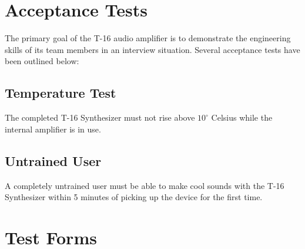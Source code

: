 \documentclass{article}
\begin{document}
\section{Acceptance Tests}
The primary goal of the T-16 audio amplifier is to demonstrate the
engineering skills of its team members in an interview
situation. Several acceptance tests have been outlined below:

\subsection{Temperature Test}
The completed T-16 Synthesizer must not rise above $10^\circ$ Celsius
while the internal amplifier is in use.
\subsection{Untrained User}
A completely untrained user must be able to make cool sounds with the
T-16 Synthesizer within 5 minutes of picking up the device for the
first time. 
\newpage
\section {Test Forms}
\end{document}

